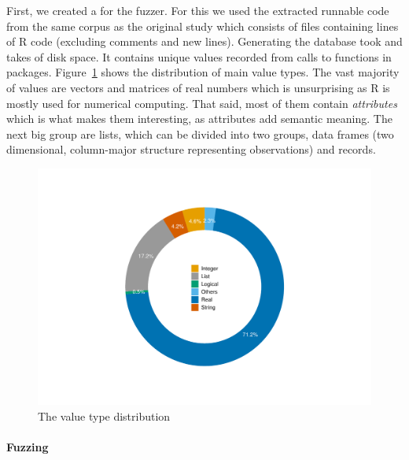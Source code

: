 \documentclass[sigplan,anonymous,review]{acmart}
\begin{document}
First, we created a \sxpdb for the fuzzer.
For this we used the extracted runnable code from the same corpus as the original study which consists of \DBNumSourceFiles files containing \DBSourceLinesOfCodeRnd lines of R code (excluding comments and new lines).
Generating the database took  and takes \DBFileSize of disk space.
It contains \DBValuesRnd unique values recorded from \DBNumCallsRnd calls to \DBNumFunctionsRnd functions in \DBNumPackages packages.
Figure~\ref{fig:argsdb-value-distribution} shows the distribution of main value types.
The vast majority of values are vectors and matrices of real numbers which is unsurprising as R is mostly used for numerical computing.
That said, most of them  contain \textit{attributes} which is what makes them interesting, as attributes add semantic meaning.
The next big group are lists, which can be divided into two groups, data frames (two dimensional, column-major structure representing observations) and records.

\begin{figure}
    \centering
    \includegraphics[width=\columnwidth]{code-and-figures/argsdb-value-distribution.pdf}
    \caption{The \sxpdb value type distribution}
    \label{fig:argsdb-value-distribution}
\end{figure}

\paragraph{Fuzzing}
\end{document}
